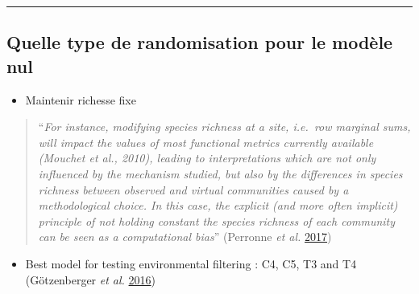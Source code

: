 \documentclass[]{article}
\providecommand{\tightlist}{%
  \setlength{\itemsep}{0pt}\setlength{\parskip}{0pt}}
\begin{document}
\begin{center}\rule{0.5\linewidth}{\linethickness}\end{center}

\subsection{\texorpdfstring{\textbf{Quelle type de randomisation pour le
modèle
nul}}{Quelle type de randomisation pour le modèle nul}}\label{quelle-type-de-randomisation-pour-le-modele-nul}

\begin{itemize}
\tightlist
\item
  Maintenir richesse fixe
\end{itemize}

\begin{quote}
``\emph{For instance, modifying species richness at a site, i.e.~row
marginal sums, will impact the values of most functional metrics
currently available (Mouchet et al., 2010), leading to interpretations
which are not only influenced by the mechanism studied, but also by the
differences in species richness between observed and virtual communities
caused by a methodological choice. In this case, the explicit (and more
often implicit) principle of not holding constant the species richness
of each community can be seen as a computational bias}'' (Perronne
\emph{et al.} \protect\hyperlink{ref-perronne2017}{2017})
\end{quote}

\begin{itemize}
\tightlist
\item
  Best model for testing environmental filtering : C4, C5, T3 and T4
  (Götzenberger \emph{et al.}
  \protect\hyperlink{ref-gotzenberger2016randomizations}{2016})
\end{itemize}
\end{document}
